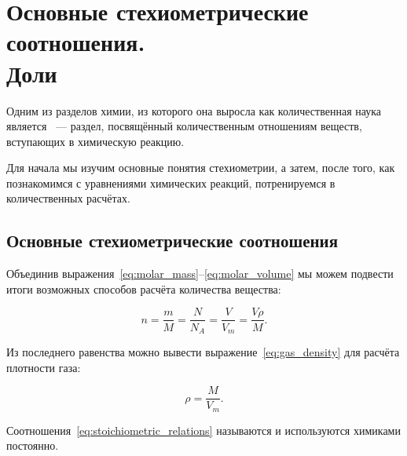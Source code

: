 \clearpage

\section[Основные стехиометрические соотношения. Доли]{Основные стехиометрические соотношения.\\Доли}

Одним из разделов химии, из которого она выросла как количественная наука является ~--- раздел, посвящённый количественным отношениям веществ, вступающих в химическую реакцию.

Для начала мы изучим основные понятия стехиометрии, а затем, после того, как познакомимся с уравнениями химических реакций, потренируемся в количественных расчётах.

\subsection*{Основные стехиометрические соотношения}

Объединив выражения~\eqref{eq:molar_mass}--\eqref{eq:molar_volume} мы можем подвести итоги возможных способов расчёта количества вещества:

\begin{equation}
    \label{eq:stoichiometric_relations}
    \boxed{n = \frac{m}{M} = \frac{N}{N_A} = \frac{V}{V_m} = \frac{V\rho }{M}}.
\end{equation}

Из последнего равенства можно вывести выражение~\eqref{eq:gas_density} для расчёта плотности газа:

\begin{equation}
    \label{eq:gas_density}
    \boxed{\rho = \frac{M}{V_m}}.
\end{equation}

Соотношения~\eqref{eq:stoichiometric_relations} называются  и используются химиками постоянно.


